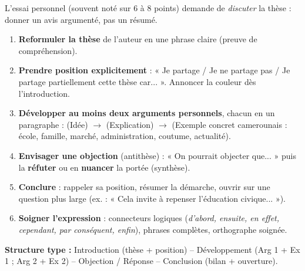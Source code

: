 \documentclass[11pt]{article}
\begin{document}
\begin{methode}
L'essai personnel (souvent noté sur 6 à 8 points) demande de \emph{discuter} la thèse : donner un avis argumenté, pas un résumé.
\begin{enumerate}
\item \textbf{Reformuler la thèse} de l'auteur en une phrase claire (preuve de compréhension).
\item \textbf{Prendre position explicitement} : « Je partage / Je ne partage pas / Je partage partiellement cette thèse car... ». Annoncer la couleur dès l'introduction.
\item \textbf{Développer au moins deux arguments personnels}, chacun en un paragraphe : (Idée) $\rightarrow$ (Explication) $\rightarrow$ (Exemple concret camerounais : école, famille, marché, administration, coutume, actualité).
\item \textbf{Envisager une objection} (antithèse) : « On pourrait objecter que... » puis la \textbf{réfuter} ou en \textbf{nuancer} la portée (synthèse).
\item \textbf{Conclure} : rappeler sa position, résumer la démarche, ouvrir sur une question plus large (ex. : « Cela invite à repenser l'éducation civique... »).
\item \textbf{Soigner l'expression} : connecteurs logiques (\emph{d'abord, ensuite, en effet, cependant, par conséquent, enfin}), phrases complètes, orthographe soignée.
\end{enumerate}
\textbf{Structure type :} Introduction (thèse + position) -- Développement (Arg 1 + Ex 1 ; Arg 2 + Ex 2) -- Objection / Réponse -- Conclusion (bilan + ouverture).
\end{methode}
\end{document}
